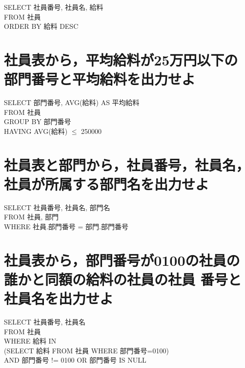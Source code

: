 \documentclass[dvipdfmx,10pt, a4j]{jarticle}
\theoremstyle{definition}
\begin{document}
\begin{flushleft}
    SELECT 社員番号, 社員名, 給料\\
    FROM 社員\\
    ORDER BY 給料 DESC\\
\end{flushleft}

\newpage
\noindent
\section{社員表から，平均給料が25万円以下の部門番号と平均給料を出力せよ}

\begin{flushleft}
    SELECT 部門番号, AVG(給料) AS 平均給料\\
    FROM 社員\\
    GROUP BY 部門番号\\
    HAVING AVG(給料) $\leq$ 250000\\
\end{flushleft}

\noindent
\section{社員表と部門から，社員番号，社員名，社員が所属する部門名を出力せよ}

\begin{flushleft}
    SELECT 社員番号, 社員名, 部門名\\
    FROM 社員, 部門\\
    WHERE 社員.部門番号 = 部門.部門番号\\
\end{flushleft}

\noindent
\section{社員表から，部門番号が0100の社員の誰かと同額の給料の社員の社員
  番号と社員名を出力せよ}

\begin{flushleft}
    SELECT 社員番号, 社員名\\
    FROM 社員\\
    WHERE 給料 IN \\
    (SELECT 給料 FROM 社員 WHERE 部門番号=0100)\\
    AND 部門番号 != 0100 OR 部門番号 IS NULL\\
\end{flushleft}
\end{document}
